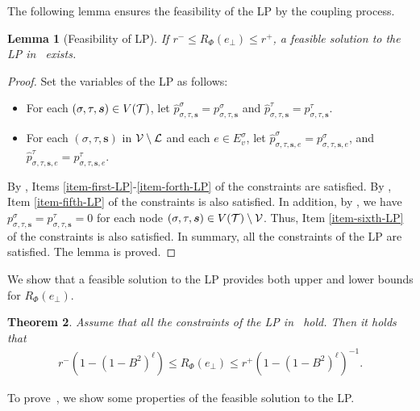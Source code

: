 \documentclass[11pt]{article}
\newtheorem{theorem}{Theorem}
\newtheorem{lemma}[theorem]{Lemma}
\newcommand{\seqS}{\boldsymbol{s}}
\newcommand{\hktodo}[1]{{\color{blue}{#1}}}
\begin{document}
The following lemma ensures the feasibility of the LP by the coupling process.

\begin{lemma}[Feasibility of LP] \label{lem:feasibility-of-LP}
    If $r^- \le R_\Phi(e_\bot) \le r^+$, a feasible solution to the LP in~ exists.
\end{lemma}
\begin{proof}
Set the variables of the LP as follows:
\begin{itemize}
    \item For each $(\sigma, \tau, \seqS) \in V(\+T)$, let $\widehat{p}_{\sigma, \tau, \seqS}^{\sigma} = p_{\sigma, \tau, \seqS}^{\sigma}$ and $\widehat{p}_{\sigma,\tau, \seqS}^{\tau} = p_{\sigma,\tau, \seqS}^{\tau}$.
    \item For each $(\sigma,\tau,\seqS)$ in $\mathcal{V}\setminus \mathcal{L}$ and each $e\in E_v^{\sigma}$, let  $\widehat{p}_{\sigma,\tau,\seqS,e}^{\sigma} = p_{\sigma,\tau,\seqS,e}^{\sigma}$, and $\widehat{p}_{\sigma,\tau,\seqS,e}^{\tau} = p_{\sigma,\tau,\seqS,e}^{\tau}$.
\end{itemize}
By , Items \ref{item-first-LP}-\ref{item-forth-LP} of the constraints are satisfied.
By , Item \ref{item-fifth-LP} of the constraints is also satisfied.
In addition, by , we have $ p^{\sigma}_{\sigma, \tau, \seqS}= p^{\tau}_{\sigma, \tau, \seqS} = 0$ for each node $(\sigma, \tau, \seqS)\in V(\+T)\setminus \+V$.
Thus, Item \ref{item-sixth-LP} of the constraints is also satisfied.
In summary, all the constraints of the LP are satisfied.
The lemma is proved.
\end{proof}


We show that a feasible solution to the LP provides both upper and lower bounds for $R_{\Phi}(e_\bot)$.

\hktodo{use $B$ not $B_{\min}$ here}
\hktodo{change all $B_{\min}$ to $B$}

\begin{theorem} \label{thm:ratio-bound-by-LP}
    Assume that all the constraints of the LP in~ hold. Then it holds that
    \begin{align*}
        r^{-} \left(1 - \left(1 - B^2\right)^{\ell}\right)\le R_{\Phi}(e_\bot) \le {r^+}\left(1 - \left(1 - B^2\right)^{\ell}\right)^{-1}.
    \end{align*}
\end{theorem}

To prove~, we show some properties of the feasible solution to the LP.
\end{document}
